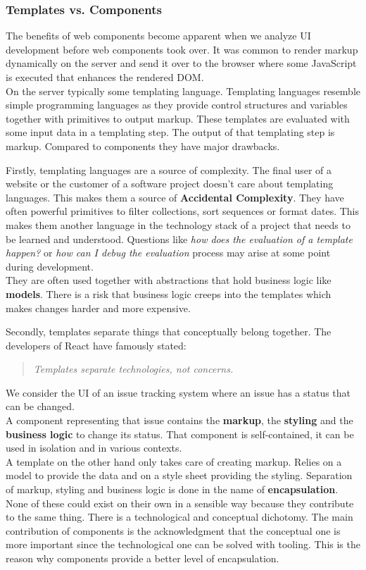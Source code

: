 \subsubsection{Templates vs. Components}

The benefits of web components become apparent when we analyze UI development before web components took over. It was common to render markup dynamically on the server and send it over to the browser where some JavaScript is executed that enhances the rendered DOM. \\
On the server typically some templating language. Templating languages resemble simple programming languages as they provide control structures and variables together with primitives to output markup. These templates are evaluated with some input data in a templating step. The output of that templating step is markup. Compared to components they have major drawbacks.

Firstly, templating languages are a source of complexity. The final user of a website or the customer of a software project doesn't care about templating languages. This makes them a source of \textbf{Accidental Complexity}. They have often powerful primitives to filter collections, sort sequences or format dates. This makes them another language in the technology stack of a project that needs to be learned and understood. Questions like \textit{how does the evaluation of a template happen?} or \textit{how can I debug the evaluation} process may arise at some point during development. \\
They are often used together with abstractions that hold business logic like \textbf{models}. There is a risk that business logic creeps into the templates which makes changes harder and more expensive.

Secondly, templates separate things that conceptually belong together. The developers of React have famously stated:
\begin{quote}
\textit{Templates separate technologies, not concerns.}
\end{quote}
We consider the UI of an issue tracking system where an issue has a status that can be changed. \\ A component representing that issue contains the \textbf{markup}, the \textbf{styling} and the \textbf{business logic} to change its status. That component is self-contained, it can be used in isolation and in various contexts. \\
A template on the other hand only takes care of creating markup. Relies on a model to provide the data and on a style sheet providing the styling.
Separation of markup, styling and business logic is done in the name of \textbf{encapsulation}. None of these could exist on their own in a sensible way because they contribute to the same thing. There is a technological and conceptual dichotomy. The main contribution of components is the acknowledgment that the conceptual one is more important since the technological one can be solved with tooling. This is the reason why components provide a better level of encapsulation.

